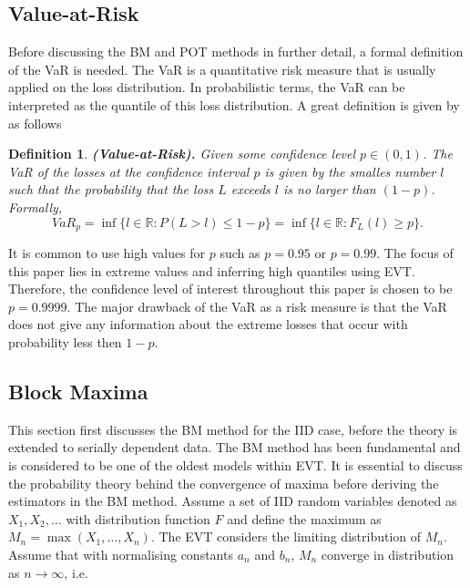 \documentclass[a4paper,12pt]{article}
\theoremstyle{plain}
\newtheorem{mydef}{Definition}
\begin{document}
\subsection{Value-at-Risk}
Before discussing the BM and POT methods in further detail, a formal definition of the VaR is needed. The VaR is a quantitative risk measure that is usually applied on the loss distribution. In probabilistic terms, the VaR can be interpreted as the quantile of this loss distribution. A great definition is given by  as follows
\begin{mydef}{\textbf{(Value-at-Risk).}}
    Given some confidence level $p \in \left(0,1\right)$. The VaR of the losses at the confidence interval $p$ is given by the smalles number $l$ such that the probability that the loss $L$ exceeds $l$ is no larger than $\left(1-p\right)$. Formally, 
    \begin{equation}
        VaR_p=\inf\{l\in\mathbb{R}: P\left(L>l\right)\leq 1-p\}=\inf\{l\in\mathbb{R}: F_L\left(l\right)\geq p\}.
    \end{equation}
\end{mydef}
\noindent It is common to use high values for $p$ such as $p=0.95$ or $p=0.99$. The focus of this paper lies in extreme values and inferring high quantiles using EVT. Therefore, the confidence level of interest throughout this paper is chosen to be $p=0.9999$. The major drawback of the VaR as a risk measure is that the VaR does not give any information about the extreme losses that occur with probability less then $1-p$.


\subsection{Block Maxima}
This section first discusses the BM method for the IID case, before the theory is extended to serially dependent data. The BM method has been fundamental and is considered to be one of the oldest models within EVT. It is essential to discuss the probability theory behind the convergence of maxima before deriving the estimators in the BM method. Assume a set of IID random variables denoted as $X_1, X_2, \dots$ with distribution function $F$ and define the maximum as $M_n=\max\left(X_1, \dots, X_n\right)$. The EVT considers the limiting distribution of $M_n$. Assume that with normalising constants $a_n$ and $b_n$, $M_n$ converge in distribution as $n\to \infty$, i.e.
\end{document}
